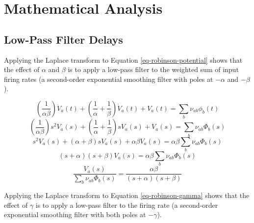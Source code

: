 
\chapter{Mathematical Analysis}
\label{sect-robinson-math}

%
%
\section{Low-Pass Filter Delays}
\label{sect-robinson-math-lowpass}

Applying the Laplace transform to Equation \ref{eq-robinson-potential} shows
that the effect of $\alpha$ and $\beta$ is to apply a low-pass filter to the
weighted sum of input firing rates (a second-order exponential smoothing
filter with poles at $-\alpha$ and $-\beta$).

\begin{equation}
\left ( \frac{1}{\alpha \beta} \right ) \ddot{V}_a(t)
+ \left ( \frac{1}{\alpha} + \frac{1}{\beta} \right ) \dot{V}_a(t)
+ V_a(t) = \sum_b \nu_{ab} \phi_b(t)
\end{equation}
%
\begin{equation}
\left ( \frac{1}{\alpha \beta} \right ) s^2 V_a(s)
+ \left ( \frac{1}{\alpha} + \frac{1}{\beta} \right ) s V_a(s)
+ V_a(s) = \sum_b \nu_{ab} \Phi_b(s)
\end{equation}
%
\begin{equation}
s^2 V_a(s) + (\alpha + \beta) s V_a(s) + \alpha \beta V_a(s)
= \alpha \beta \sum_b \nu_{ab} \Phi_b(s)
\end{equation}
%
\begin{equation}
(s + \alpha) (s + \beta) V_a(s) = \alpha \beta \sum_b \nu_{ab} \Phi_b(s)
\end{equation}
%
\begin{equation}
\frac{V_a(s)}{\sum_b \nu_{ab} \Phi_b(s)}
= \frac{\alpha \beta}{(s + \alpha) (s + \beta)}
\label{eq-robinson-lowpass-albet}
\end{equation}

Applying the Laplace transform to Equation \ref{eq-robinson-gamma} shows
that the effect of $\gamma$ is to apply a low-pass filter to the firing rate
(a second-order exponential smoothing filter with both poles at $-\gamma$).

